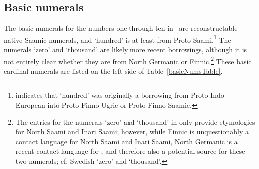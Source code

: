\subsection{Basic numerals}\label{basicNums}
The basic numerals for the numbers one through ten in \PS\ are reconstructable native Saamic numerals, and  ‘hundred’ is at least from Proto-Saami.\footnote{\citet[234-235]{Sammallahti1998} indicates that  ‘hundred’ was originally a borrowing from Proto-Indo-European into Proto-Finno-Ugric or Proto-Finno-Saamic.} 
The numerals  ‘zero’ and  ‘thousand’ are likely more recent borrowings, although it is not entirely clear whether they are from North Germanic or %
Finnic.\footnote{The entries for the numerals ‘zero’ and ‘thousand’ in \cite{alguWebsite} only provide etymologies for North Saami and Inari Saami; however, while Finnic is unquestionably a contact language for North Saami and Inari Saami, North Germanic is a recent contact language for \PS, and therefore also a potential source for these two numerals; cf. Swedish  ‘zero’ and  ‘thousand’. } 
These basic cardinal numerals are listed on the left side of Table~\vref{basicNumsTable}.
